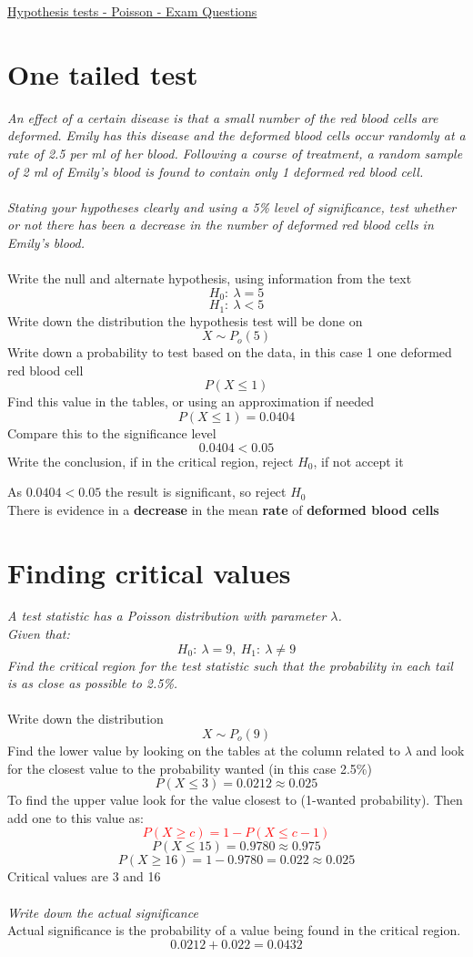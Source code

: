 \documentclass{article}[18pt]
\begin{document}
\begin{center}
\underline{\huge Hypothesis tests - Poisson - Exam Questions}
\end{center}
\section{One tailed test}
\textit{An effect of a certain disease is that a small number of the red blood cells are deformed. Emily
has this disease and the deformed blood cells occur randomly at a rate of 2.5 per ml of her
blood. Following a course of treatment, a random sample of 2 ml of Emily’s blood is found to
contain only 1 deformed red blood cell.\\
\\
Stating your hypotheses clearly and using a 5\% level of significance, test whether or not there
has been a decrease in the number of deformed red blood cells in Emily’s blood.}\\
\\
Write the null and alternate hypothesis, using information from the text
$$H_0:\ \lambda=5$$
$$H_1:\ \lambda<5$$
Write down the distribution the hypothesis test will be done on
$$X\sim P_o(5)$$
Write down a probability to test based on the data, in this case 1 one deformed red blood cell
$$P(X\leqslant1)$$
Find this value in the tables, or using an approximation if needed
$$P(X\leqslant1)=0.0404$$
Compare this to the significance level
$$0.0404<0.05$$
Write the conclusion, if in the critical region, reject $H_0$, if not accept it
\begin{center}
As $0.0404<0.05$ the result is significant, so reject $H_0$\\
There is evidence in a \textbf{decrease} in the mean \textbf{rate} of \textbf{deformed blood cells}
\end{center}
\section{Finding critical values}
\textit{A test statistic has a Poisson distribution with parameter $\lambda$.}\\
\textit{Given that:}
$$H_0: \ \lambda=9,\ H_1: \ \lambda\neq9$$ 
\textit{Find the critical region for the test statistic such that the probability in each tail is as close
as possible to 2.5\%.}\\
\\
Write down the distribution
$$X\sim P_o(9)$$
Find the lower value by looking on the tables at the column related to $\lambda$ and look for the closest value to the probability wanted (in this case 2.5\%)
$$P(X\leqslant3)=0.0212\approx0.025$$
To find the upper value look for the value closest to (1-wanted probability). Then add one to this value as:
\textcolor{red}{$$P(X\geqslant c)=1-P(X\leqslant c-1)$$}
$$P(X\leqslant15)=0.9780\approx0.975$$
$$P(X\geqslant16)=1-0.9780=0.022\approx0.025$$
Critical values are 3 and 16\\
\\
\textit{Write down the actual significance}
\\
Actual significance is the probability of a value being found in the critical region.
$$0.0212+0.022=0.0432$$
\newpage
\end{document}
